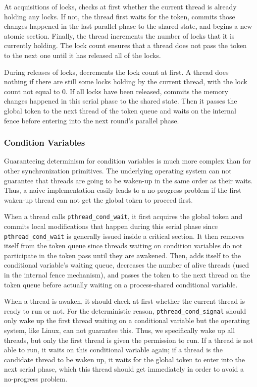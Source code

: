 At acquisitions of locks, \dthreads{} checks at first whether the current thread is already holding any locks. If not, the thread first waits for the token, commits those changes happened in the last parallel phase to the shared state, and begins a new atomic section. Finally, the thread increments the number of locks that it is currently holding. The lock count ensures that a thread does not pass the token to the next one until it has released all of the locks.

During releases of locks, \dthreads{} decrements the lock count at first. A thread does nothing if there are still some locks holding by the current thread, with the lock count not equal to 0. If all locks have been released, \dthreads{} commits the memory changes happened in this serial phase to the shared state. Then it passes the global token to the next thread of the token queue and waits on the internal fence before entering into the next round's parallel phase.

\subsubsection{Condition Variables}
\label{sec:condwait}

Guaranteeing determinism for condition variables is much more complex than for other synchronization primitives. The underlying operating system can not guarantee that threads are going to be waken-up in the same order as their waits. Thus, a naive implementation easily leads to a no-progress problem if the first waken-up thread can not get the global token to proceed first.

When a thread calls \texttt{pthread\_cond\_wait}, it first acquires the global token and commits local modifications that happen during this serial phase since \texttt{pthread\_cond\_wait} is generally issued inside a critical section. It then removes itself from the token queue since threads waiting on condition variables do not participate in the token pass until they are awakened. Then, \dthreads{} adds itself to the conditional variable's waiting queue, decreases the number of alive threads (used in the internal fence mechanism), and passes the token to the next thread on the token queue before actually waiting on a process-shared conditional variable. 

When a thread is awaken, it should check at first whether the current thread is ready to run or not. For the deterministic reason, \texttt{pthread\_cond\_signal} should only wake up the first thread waiting on a conditional variable but the operating system, like Linux, can not guarantee this. Thus, we specifically wake up all threads, but only the first thread is given the permission to run. If a thread is not able to run, it waits on this conditional variable again; if a thread is the candidate thread to be waken up, it waits for the global token to enter into the next serial phase, which this thread should get immediately in order to avoid a no-progress problem. 

